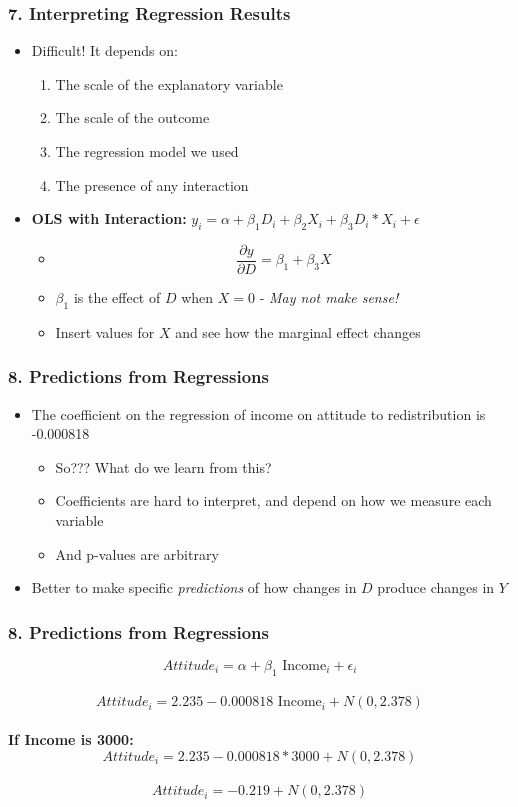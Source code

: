 \documentclass[xcolor=x11names,compress]{beamer}\usepackage[]{graphicx}\usepackage[]{color}
\renewcommand{\(}{\begin{columns}}
\renewcommand{\)}{\end{columns}}
\newcommand{\<}[1]{\begin{column}{#1}}
\renewcommand{\>}{\end{column}}
\begin{document}
\begin{frame}
\frametitle{7. Interpreting Regression Results}
\begin{itemize}
\item Difficult! It depends on:
\begin{enumerate}
\item The scale of the explanatory variable
\item The scale of the outcome
\item The regression model we used
\item The presence of any interaction
\end{enumerate}
\item \textbf{OLS with Interaction:} $y_i = \alpha + \beta_1 D_i + \beta_2 X_i + \beta_3 D_i * X_i + \epsilon$
\begin{itemize}
\item $$ \frac{\partial y}{\partial D} = \beta_1 + \beta_3 X$$
\item $\beta_1$ is the effect of $D$ when $X=0$ - \textit{May not make sense!}
\item Insert values for $X$ and see how the marginal effect changes
\end{itemize}
\end{itemize}
\end{frame}

\begin{frame}
\frametitle{8. Predictions from Regressions}
\begin{itemize}
\item The coefficient on the regression of income on attitude to redistribution is -0.000818
\begin{itemize}
\pause
\item So??? What do we learn from this?
\pause
\item Coefficients are hard to interpret, and depend on how we measure each variable
\item And p-values are arbitrary
\end{itemize}  
\pause
\item Better to make specific \textit{predictions} of how changes in $D$ produce changes in $Y$
\end{itemize}
\end{frame}

\begin{frame}
\frametitle{8. Predictions from Regressions}
$$Attitude_i = \alpha + \beta_1 \text{ Income}_i + \epsilon_i$$ \\
\pause
$$Attitude_i = 2.235 - 0.000818 \text{ Income}_i + N(0,2.378)$$ \\
\pause
\textbf{If Income is 3000:}  \\
$$Attitude_i = 2.235-0.000818*3000 + N(0,2.378)$$ \\
$$Attitude_i = -0.219 + N(0,2.378)$$
\end{frame}
\end{document}
